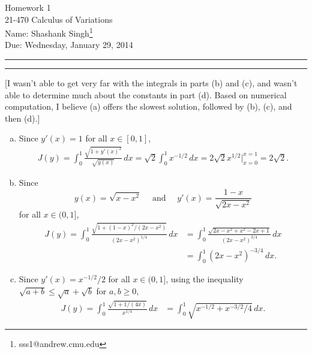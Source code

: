 \documentclass[11pt]{article}
\makeatletter
\newcounter{questionCounter}
\newcounter{partCounter}[questionCounter]
\newenvironment{question}[2][\arabic{questionCounter}]{%
    \setcounter{partCounter}{0}%
    \vspace{.25in} \hrule \vspace{0.5em}%
        \noindent{\bf #2}%
    \vspace{0.8em} \hrule \vspace{.10in}%
    \addtocounter{questionCounter}{1}%
}{}
\newcommand{\myname}{Shashank Singh\footnote{sss1@andrew.cmu.edu}}
\newcommand{\myclass}{21-470 Calculus of Variations}
\newcommand{\myhwnum}{1}
\newcommand{\duedate}{Wednesday, January 29, 2014}
\makeatother
\begin{document}
\thispagestyle{plain}

{\Large Homework \myhwnum} \\
\myclass \\
Name: \myname \\
Due: \duedate

\begin{question}{Problem 1}
[I wasn't able to get very far with the integrals in parts (b) and (c), and
wasn't able to determine much about the constants in part (d). Based on
numerical computation, I believe (a) offers the slowest solution, followed by
(b), (c), and then (d).]
\begin{enumerate}[(a)]
\item Since $y'(x) = 1$ for all $x \in [0,1]$,
\begin{align*}
J(y)
    = \int_0^1 \frac{\sqrt{1 + y'(x)^2}}{\sqrt{y(x)}} \, dx
    = \sqrt{2} \int_0^1 x^{-1/2} \, dx
    = 2\sqrt{2} x^{1/2} \bigg|_{x = 0}^{x = 1}
    = 2\sqrt{2}.
\end{align*}
 
\item Since
\[y(x) = \sqrt{x - x^2}
    \quad \mbox{ and } \quad
y'(x) = \frac{1 - x}{\sqrt{2x - x^2}}\]
for all $x \in (0,1]$,
\begin{align*}
J(y)
    = \int_0^1 \frac{\sqrt{1 + (1 - x)^2/(2x - x^2)}}{(2x - x^2)^{1/4}} \, dx
 &  = \int_0^1 \frac{\sqrt{2x - x^2 + x^2 - 2x + 1}}{(2x - x^2)^{3/4}} \, dx \\
 &  = \int_0^1 (2x - x^2)^{-3/4} \, dx.
\end{align*}
 
\item Since $y'(x) = x^{-1/2}/2$ for all $x \in (0,1]$, using the inequality
$\sqrt{a + b} \leq \sqrt{a} + \sqrt{b}$ for $a,b \geq 0$,
\begin{align*}
J(y)
    = \int_0^1 \frac{\sqrt{1 + 1/(4x)}}{x^{1/4}} \, dx
 &  = \int_0^1 \sqrt{x^{-1/2} + x^{-3/2}/4} \, dx.
\end{align*}


\end{enumerate}
\end{question}
\end{document}
